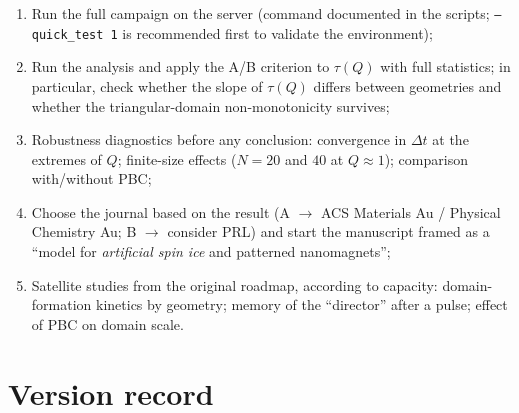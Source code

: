 \documentclass[11pt,a4paper]{article}
\newcommand{\code}[1]{\texttt{#1}}
\begin{document}
\begin{enumerate}
\item Run the full campaign on the server (command documented in the scripts; \code{--quick\_test 1} is recommended first to validate the environment);
\item Run the analysis and apply the A/B criterion to $\tau(Q)$ with full statistics; in particular, check whether the slope of $\tau(Q)$ differs between geometries and whether the triangular-domain non-monotonicity survives;
\item Robustness diagnostics before any conclusion: convergence in $\Delta t$ at the extremes of $Q$; finite-size effects ($N = 20$ and $40$ at $Q \approx 1$); comparison with/without PBC;
\item Choose the journal based on the result (A $\to$ ACS Materials Au / Physical Chemistry Au; B $\to$ consider PRL) and start the manuscript framed as a ``model for \emph{artificial spin ice} and patterned nanomagnets'';
\item Satellite studies from the original roadmap, according to capacity: domain-formation kinetics by geometry; memory of the ``director'' after a pulse; effect of PBC on domain scale.
\end{enumerate}

\section{Version record}
\end{document}
